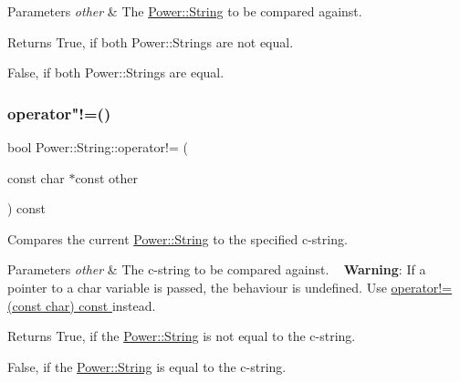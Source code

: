 \begin{DoxyParams}{Parameters}
{\em other} & The \hyperlink{class_power_1_1_string}{Power\+::\+String} to be compared against. \\
\hline
\end{DoxyParams}
\begin{DoxyReturn}{Returns}
True, if both Power\+::\+Strings are not equal. 

False, if both Power\+::\+Strings are equal. 
\end{DoxyReturn}
\mbox{\label{class_power_1_1_string_a267b8f261bcafb9ec6d86cfe12494c94}} 
\subsubsection{\texorpdfstring{operator"!=()}{operator!=()}\hspace{0.1cm}{\footnotesize\ttfamily [2/3]}}
{\footnotesize\ttfamily bool Power\+::\+String\+::operator!= (\begin{DoxyParamCaption}\item[{const char $\ast$const}]{other }\end{DoxyParamCaption}) const\hspace{0.3cm}{\ttfamily [inline]}}



Compares the current \hyperlink{class_power_1_1_string}{Power\+::\+String} to the specified c-\/string. 


\begin{DoxyParams}{Parameters}
{\em other} & The c-\/string to be compared against. ~\newline
 {\bfseries Warning}\+: If a pointer to a char variable is passed, the behaviour is undefined. Use \hyperlink{class_power_1_1_string_a3216ffa5d292b08997d1c93d3c33251e}{operator!=(const char) const }instead. \\
\hline
\end{DoxyParams}
\begin{DoxyReturn}{Returns}
True, if the \hyperlink{class_power_1_1_string}{Power\+::\+String} is not equal to the c-\/string. 

False, if the \hyperlink{class_power_1_1_string}{Power\+::\+String} is equal to the c-\/string. 
\end{DoxyReturn}
\mbox{\label{class_power_1_1_string_a3216ffa5d292b08997d1c93d3c33251e}} 
